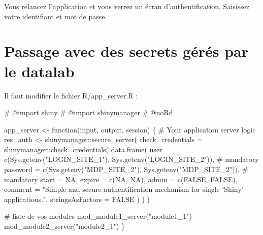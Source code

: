 \documentclass[
  letterpaper,
  DIV=11,
  numbers=noendperiod]{scrreprt}
\newenvironment{Shaded}{\begin{snugshade}}{\end{snugshade}}
\newcommand{\AttributeTok}[1]{\textcolor[rgb]{0.40,0.45,0.13}{#1}}
\newcommand{\CommentTok}[1]{\textcolor[rgb]{0.37,0.37,0.37}{#1}}
\newcommand{\ConstantTok}[1]{\textcolor[rgb]{0.56,0.35,0.01}{#1}}
\newcommand{\ControlFlowTok}[1]{\textcolor[rgb]{0.00,0.23,0.31}{#1}}
\newcommand{\FunctionTok}[1]{\textcolor[rgb]{0.28,0.35,0.67}{#1}}
\newcommand{\NormalTok}[1]{\textcolor[rgb]{0.00,0.23,0.31}{#1}}
\newcommand{\OtherTok}[1]{\textcolor[rgb]{0.00,0.23,0.31}{#1}}
\newcommand{\SpecialCharTok}[1]{\textcolor[rgb]{0.37,0.37,0.37}{#1}}
\newcommand{\StringTok}[1]{\textcolor[rgb]{0.13,0.47,0.30}{#1}}
\begin{document}
Vous relancez l'application et vous verrez un écran d'authentification.
Saisissez votre identifiant et mot de passe.

\hypertarget{passage-avec-des-secrets-guxe9ruxe9s-par-le-datalab}{%
\section{Passage avec des secrets gérés par le
datalab}\label{passage-avec-des-secrets-guxe9ruxe9s-par-le-datalab}}

Il faut modifier le fichier R/app\_server.R :

\begin{Shaded}
\begin{Highlighting}[]
\CommentTok{\#\textquotesingle{} @import shiny}
\CommentTok{\#\textquotesingle{} @import shinymanager}
\CommentTok{\#\textquotesingle{} @noRd}

\NormalTok{app\_server }\OtherTok{\textless{}{-}} \ControlFlowTok{function}\NormalTok{(input, output, session) \{}
  \CommentTok{\# Your application server logic}
\NormalTok{  res\_auth }\OtherTok{\textless{}{-}}\NormalTok{ shinymanager}\SpecialCharTok{::}\FunctionTok{secure\_server}\NormalTok{(}
    \AttributeTok{check\_credentials =}\NormalTok{ shinymanager}\SpecialCharTok{::}\FunctionTok{check\_credentials}\NormalTok{(}
      \FunctionTok{data.frame}\NormalTok{(}
        \AttributeTok{user =} \FunctionTok{c}\NormalTok{(}\FunctionTok{Sys.getenv}\NormalTok{(}\StringTok{"LOGIN\_SITE\_1"}\NormalTok{), }\FunctionTok{Sys.getenv}\NormalTok{(}\StringTok{"LOGIN\_SITE\_2"}\NormalTok{)), }\CommentTok{\# mandatory}
        \AttributeTok{password =} \FunctionTok{c}\NormalTok{(}\FunctionTok{Sys.getenv}\NormalTok{(}\StringTok{"MDP\_SITE\_2"}\NormalTok{), }\FunctionTok{Sys.getenv}\NormalTok{(}\StringTok{"MDP\_SITE\_2"}\NormalTok{)), }\CommentTok{\# mandatory}
        \AttributeTok{start =} \ConstantTok{NA}\NormalTok{, }
        \AttributeTok{expire =} \FunctionTok{c}\NormalTok{(}\ConstantTok{NA}\NormalTok{, }\ConstantTok{NA}\NormalTok{),}
        \AttributeTok{admin =} \FunctionTok{c}\NormalTok{(}\ConstantTok{FALSE}\NormalTok{, }\ConstantTok{FALSE}\NormalTok{),}
        \AttributeTok{comment =} \StringTok{"Simple and secure authentification mechanism}
\StringTok{  for single ‘Shiny’ applications."}\NormalTok{,}
        \AttributeTok{stringsAsFactors =} \ConstantTok{FALSE}
\NormalTok{      )}
\NormalTok{    )}
\NormalTok{  )}

  \CommentTok{\# liste de vos modules}
  \FunctionTok{mod\_module1\_server}\NormalTok{(}\StringTok{"module1\_1"}\NormalTok{)}
  \FunctionTok{mod\_module2\_server}\NormalTok{(}\StringTok{"module2\_1"}\NormalTok{)}
\NormalTok{\}}
\end{Highlighting}
\end{Shaded}
\end{document}
